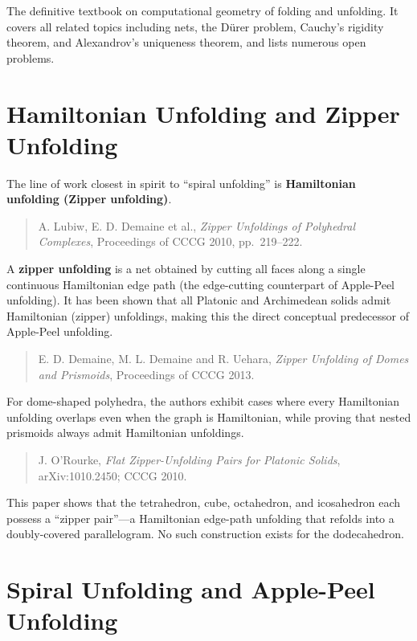 \documentclass[a4paper,11pt]{article}
\begin{document}
The definitive textbook on computational geometry of folding and unfolding.
It covers all related topics including nets, the D\"{u}rer problem, Cauchy's rigidity theorem,
and Alexandrov's uniqueness theorem, and lists numerous open problems.

\section{Hamiltonian Unfolding and Zipper Unfolding}

The line of work closest in spirit to ``spiral unfolding'' is
\textbf{Hamiltonian unfolding (Zipper unfolding)}.

\begin{quotation}\noindent
  A. Lubiw, E. D. Demaine et al.,
  \textit{Zipper Unfoldings of Polyhedral Complexes},
  Proceedings of CCCG 2010, pp.~219--222.
\end{quotation}

A \textbf{zipper unfolding} is a net obtained by cutting all faces along a single continuous
Hamiltonian edge path (the edge-cutting counterpart of Apple-Peel unfolding).
It has been shown that all Platonic and Archimedean solids admit Hamiltonian (zipper) unfoldings,
making this the direct conceptual predecessor of Apple-Peel unfolding.

\begin{quotation}\noindent
  E. D. Demaine, M. L. Demaine and R. Uehara,
  \textit{Zipper Unfolding of Domes and Prismoids},
  Proceedings of CCCG 2013.
\end{quotation}

For dome-shaped polyhedra, the authors exhibit cases where every Hamiltonian unfolding overlaps
even when the graph is Hamiltonian, while proving that nested prismoids always admit
Hamiltonian unfoldings.

\begin{quotation}\noindent
  J. O'Rourke,
  \textit{Flat Zipper-Unfolding Pairs for Platonic Solids},
  arXiv:1010.2450; CCCG 2010.
\end{quotation}

This paper shows that the tetrahedron, cube, octahedron, and icosahedron each possess a
``zipper pair''---a Hamiltonian edge-path unfolding that refolds into a doubly-covered
parallelogram. No such construction exists for the dodecahedron.

\section{Spiral Unfolding and Apple-Peel Unfolding}
\end{document}

